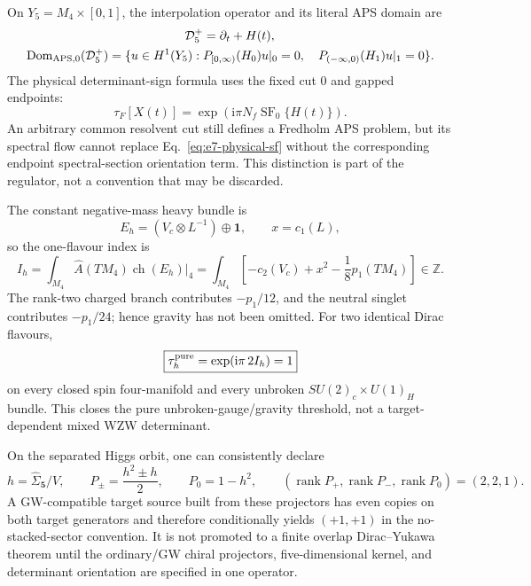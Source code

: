 \documentclass[11pt]{article}
\numberwithin{equation}{section}
\newcommand{\ZZ}{\mathbb Z}
\newcommand{\ii}{\mathrm i}
\newcommand{\rank}{\operatorname{rank}}
\begin{document}
On \(Y_5=M_4\times[0,1]\), the interpolation operator and its literal APS
domain are
\begin{align}
 {\cal D}_5^+&=\partial_t+H(t),\nonumber\\
 \operatorname{Dom}_{\rm APS,0}({\cal D}_5^+)
 =\{u\in H^1(Y_5):{}&P_{[0,\infty)}(H_0)u|_0=0,\quad
 P_{(-\infty,0)}(H_1)u|_1=0\}.
 \label{eq:e7-aps-domain}
\end{align}
The physical determinant-sign formula uses the fixed cut \(0\) and gapped
endpoints:
\begin{equation}
 \tau_F[X(t)]=\exp\!\left(\ii\pi N_f
        \operatorname{SF}_0\{H(t)\}\right).
 \label{eq:e7-physical-sf}
\end{equation}
An arbitrary common resolvent cut still defines a Fredholm APS problem, but
its spectral flow cannot replace Eq.~\eqref{eq:e7-physical-sf} without the
corresponding endpoint spectral-section orientation term.  This distinction
is part of the regulator, not a convention that may be discarded.

The constant negative-mass heavy bundle is
\begin{equation}
 E_h=(V_c\otimes L^{-1})\oplus\bm1,\qquad x=c_1(L),
\end{equation}
so the one-flavour index is
\begin{equation}
 I_h=\int_{M_4}\widehat A(TM_4)\operatorname{ch}(E_h)\big|_4
 =\int_{M_4}\left[-c_2(V_c)+x^2-\frac18p_1(TM_4)\right]\in\ZZ.
 \label{eq:e7-heavy-index}
\end{equation}
The rank-two charged branch contributes \(-p_1/12\), and the neutral singlet
contributes \(-p_1/24\); hence gravity has not been omitted.  For two identical
Dirac flavours,
\begin{equation}
 \boxed{\tau_h^{\rm pure}=\exp(\ii\pi\,2I_h)=1}
 \label{eq:e7-heavy-phase}
\end{equation}
on every closed spin four-manifold and every unbroken
\(SU(2)_c\times U(1)_H\) bundle.  This closes the pure unbroken-gauge/gravity
threshold, not a target-dependent mixed WZW determinant.

On the separated Higgs orbit, one can consistently declare
\begin{equation}
 h=\widehat\Sigma_{\bm5}/V,\qquad
 P_\pm=\frac{h^2\pm h}{2},\qquad P_0=1-h^2,\qquad
 (\rank P_+,\rank P_-,\rank P_0)=(2,2,1).
 \label{eq:e7-higgs-projectors}
\end{equation}
A GW-compatible target source built from these projectors has even copies on
both target generators and therefore conditionally yields \((+1,+1)\) in the
no-stacked-sector convention.  It is not promoted to a finite overlap
Dirac--Yukawa theorem until the ordinary/GW chiral projectors, five-dimensional
kernel, and determinant orientation are specified in one operator.
\end{document}
